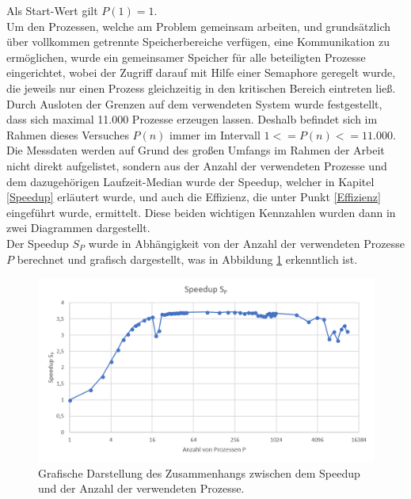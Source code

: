 \begin{description}
						Als Start-Wert gilt $P(1) = 1$.\\
						Um den Prozessen, welche am Problem gemeinsam arbeiten, und grundsätzlich über vollkommen getrennte Speicherbereiche verfügen, eine Kommunikation zu ermöglichen, wurde ein gemeinsamer Speicher für alle beteiligten Prozesse eingerichtet, wobei der Zugriff darauf mit Hilfe einer Semaphore geregelt wurde, die jeweils nur einen Prozess gleichzeitig in den kritischen Bereich eintreten ließ.\\
						Durch Ausloten der Grenzen auf dem verwendeten System wurde festgestellt, dass sich maximal 11.000 Prozesse erzeugen lassen. Deshalb befindet sich im Rahmen dieses Versuches $P(n)$ immer im Intervall $1 <= P(n) <= 11.000$.
						Die Messdaten werden auf Grund des großen Umfangs im Rahmen der Arbeit nicht direkt aufgelistet, sondern aus der Anzahl der verwendeten Prozesse und dem dazugehörigen Laufzeit-Median wurde der Speedup, welcher in Kapitel \ref{Speedup} erläutert wurde, und auch die Effizienz, die unter Punkt \ref{Effizienz} eingeführt wurde, ermittelt. Diese beiden wichtigen Kennzahlen wurden dann in zwei Diagrammen dargestellt.\\
						Der Speedup $S_P$ wurde in Abhängigkeit von der Anzahl der verwendeten Prozesse $P$ berechnet und grafisch dargestellt, was in Abbildung \ref{fig:Speedup_Prozesse} erkenntlich ist.
						
						\begin{figure}
							\centering	
							\includegraphics[width=12cm]{Abbildungen/Speedup_Prozesse.png}
							\caption{Grafische Darstellung des Zusammenhangs zwischen dem Speedup und der Anzahl der verwendeten Prozesse.}
							\label{fig:Speedup_Prozesse}
						\end{figure}
					

\end{description}
